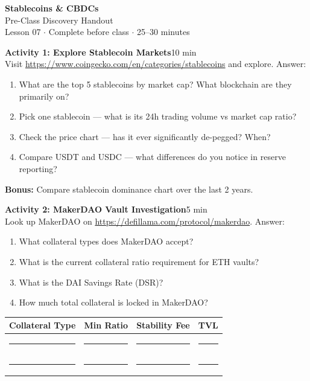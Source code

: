 \documentclass[11pt,a4paper]{article}
\newcommand{\activitybox}[3]{%
  \noindent\colorbox{mllavender4}{\parbox{\dimexpr\linewidth-2\fboxsep}{%
    \textbf{\color{mlpurple}#1}\hfill\textcolor{mlgray}{\small #2}\\[2pt]#3%
  }}\par\vspace{4pt}%
}
\newcommand{\fillcell}{\rule{2.2cm}{0.3pt}}
\begin{document}
\begin{center}
{\LARGE\color{mlpurple}\textbf{Stablecoins \& CBDCs}}\\[4pt]
{\large\color{mlblue}Pre-Class Discovery Handout}\\[2pt]
{\small\color{mlgray}Lesson 07 $\cdot$ Complete before class $\cdot$ 25--30 minutes}
\end{center}
\vspace{4pt}

\activitybox{Activity 1: Explore Stablecoin Markets}{10 min}{%
Visit \url{https://www.coingecko.com/en/categories/stablecoins} and explore. Answer:
\begin{enumerate}
\item What are the top 5 stablecoins by market cap? What blockchain are they primarily on?
\item Pick one stablecoin --- what is its 24h trading volume vs market cap ratio?
\item Check the price chart --- has it ever significantly de-pegged? When?
\item Compare USDT and USDC --- what differences do you notice in reserve reporting?
\end{enumerate}
\textbf{Bonus:} Compare stablecoin dominance chart over the last 2 years.
}

\vspace{2pt}

\activitybox{Activity 2: MakerDAO Vault Investigation}{5 min}{%
Look up MakerDAO on \url{https://defillama.com/protocol/makerdao}. Answer:
\begin{enumerate}
\item What collateral types does MakerDAO accept?
\item What is the current collateral ratio requirement for ETH vaults?
\item What is the DAI Savings Rate (DSR)?
\item How much total collateral is locked in MakerDAO?
\end{enumerate}
\vspace{4pt}
{\footnotesize\renewcommand{\arraystretch}{1.35}%
\setlength{\tabcolsep}{4pt}%
\begin{tabular}{@{}llll@{}}
\toprule
\textbf{Collateral Type} & \textbf{Min Ratio} & \textbf{Stability Fee} & \textbf{TVL} \\
\midrule
\fillcell & \fillcell & \fillcell & \fillcell \\
\fillcell & \fillcell & \fillcell & \fillcell \\
\bottomrule
\end{tabular}}
\vspace{2pt}
}
\end{document}
